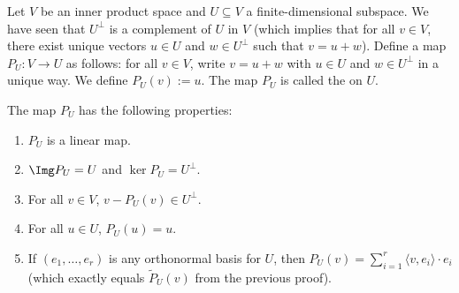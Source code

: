 \begin{definition}
\label{def:orthogonal_projection}
Let $V$ be an inner product space and $U \subseteq V$ a finite-di\-men\-sional subspace. We have seen that $U^\perp$ is a complement of $U$ in $V$ (which implies that for all $v \in V$, there exist unique vectors $u \in U$ and $w \in U^\perp$ such that $v = u + w$).
Define a map $P_U \colon V \to U$ as follows: for all $v \in V$, write $v = u + w$ with $u \in U$ and $w \in U^\perp$ in a unique way. We define $P_U(v) := u$. The map $P_U$ is called the  on $U$.
\end{definition}

\begin{proposition}
\label{prop:orthogonal_projection_properties}
The map $P_U$ has the following properties:
\begin{enumerate}[label=\textbf{(\alph*)}]
    \item $P_U$ is a linear map.
    \item $\Img P_U = U$ and $\ker P_U = U^\perp$.
    \item For all $v \in V$, $v - P_U(v) \in U^\perp$.
    \item For all $u \in U$, $P_U(u) = u$.
    \item If $(e_1, \dots, e_r)$ is any orthonormal basis for $U$, then $P_U(v) = \sum_{i=1}^r \langle v, e_i \rangle \cdot e_i$ (which exactly equals $\widetilde{P}_U(v)$ from the previous proof).
\end{enumerate}
\end{proposition}

